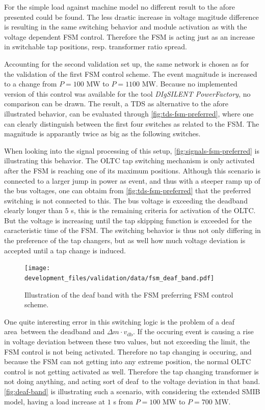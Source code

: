 For the simple load against machine model no different result to the afore presented could be found.
The less drastic increase in voltage magitude difference is resulting in the same switching behavior and module activation as with the voltage dependent \acs{FSM} control.
Therefore the \acs{FSM} is acting just as an increase in switchable tap positions, resp. transformer ratio spread.

Accounting for the second validation set up, the same network is chosen as for the validation of the first \acs{FSM} control scheme.
The event magnitude is increased to a change from $P=100\text{ MW}$ to $P=1100\text{ MW}$.
Because no implemented version of this control was available for the tool \textit{DIgSILENT PowerFactory}, no comparison can be drawn.
The result, a \acs{TDS} as alternative to the afore illustrated behavior, can be evaluated through \autoref{fig:tds-fsm-preferred}, where one can clearly distinguish between the first four switches as related to the \acs{FSM}.
The magnitude is apparantly twice as big as the following switches.

When looking into the signal processing of this setup, \autoref{fig:signals-fsm-preferred} is illustrating this behavior.
The \acs{OLTC} tap switching mechanism is only activated after the \acs{FSM} is reaching one of its maximum positions.
Although this scenario is connected to a larger jump in power as event, and thus with a steeper ramp up of the bus voltages, one can obtaim from \autoref{fig:tds-fsm-preferred} that the preferred switching is not connected to this.
The bus voltage is exceeding the deadband clearly longer than $5$ s, this is the remaining criteria for activation of the \acs{OLTC}.
But the voltage is increasing until the tap skipping function is exceeded for the caracteristic time of the \acs{FSM}.
The switching behavior is thus not only differing in the preference of the tap changers, but as well how much voltage deviation is accepted until a tap change is induced. 

\begin{figure}[htbp!]
    \centering
    \texttt{[image: development\_files/validation/data/fsm\_deaf\_band.pdf]}
    \caption[Illustration of the \glqq deaf band\grqq~with the FSM preferring FSM control scheme]{Illustration of the deaf band with the FSM preferring FSM control scheme.}
    \label{fig:deaf-band}
\end{figure}

One quite interesting error in this switching logic is the problem of a \glqq deaf area\grqq~between the deadband and $\Delta m \cdot v_\mathrm{db}$.
If the occuring event is causing a rise in voltage deviation between these two values, but not exceeding the limit, the \acs{FSM} control is not being activated.
Therefore no tap changing is occuring, and because the \acs{FSM} can not getting into any extreme position, the normal \acs{OLTC} control is not getting activated as well.
Therefore the tap changing transformer is not doing anything, and acting sort of \glqq deaf\grqq~to the voltage deviation in that band.
\autoref{fig:deaf-band} is illustrating such a scenario, with considering the extended \acs{SMIB} model, having a load increase at $1$ s from $P=100\text{ MW}$ to $P=700\text{ MW}$.

